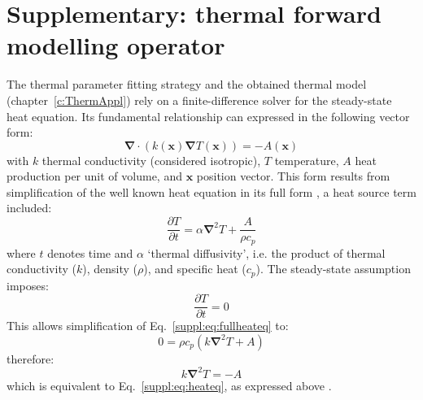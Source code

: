\chapter{Supplementary: thermal forward modelling operator}
\label{c:ThermModel}

The thermal parameter fitting strategy and the obtained thermal model (chapter~\ref{c:ThermAppl}) rely on a finite-difference solver for the steady-state heat equation.
Its fundamental relationship can expressed in the following vector form:
\begin{equation}
    \label{suppl:eq:heateq}
    \bm{\nabla} \cdot ( k(\bm{x}) \bm{\nabla} T(\bm{x}) ) = - A(\bm{x})
\end{equation}
with $k$ thermal conductivity (considered isotropic), $T$ temperature, $A$ heat production per unit of volume, and $\bm{x}$ position vector.
This form results from simplification of the well known heat equation in its full form \parencites{Fourier1822,Carslaw1959}, a heat source term included:
\begin{equation}
    \label{suppl:eq:fullheateq}
    \frac{\partial T}{\partial t} = \alpha \bm{\nabla}^2 T + \frac{A}{\rho c_p}
\end{equation}
where $t$ denotes time and $\alpha$ `thermal diffusivity', i.e. the product of thermal conductivity ($k$), density ($\rho$), and specific heat ($c_p$).
The steady-state assumption imposes:
\begin{equation}
    \label{suppl:eq:steadystate}
    \frac{\partial T}{\partial t} = 0
\end{equation}
This allows simplification of Eq.~\ref{suppl:eq:fullheateq} to:
\begin{equation}
    \label{suppl:eq:steadystatefullheateq}
    0 = \rho c_p \left( k \bm{\nabla}^2 T + A \right)
\end{equation}
therefore:
\begin{equation}
    \label{suppl:eq:steadystatefullheateq_simplified}
    k \bm{\nabla}^2 T = - A
\end{equation}
which is equivalent to Eq.~\ref{suppl:eq:heateq}, as expressed above \parencite[e.g. ][, chapter 3]{stuwe2007geodynamics}.

